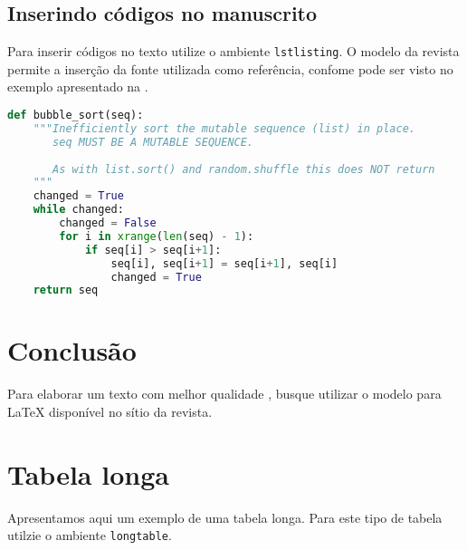 \documentclass[anonymous=true]{textolivre}
\begin{document}
\lipsum[10-14]



\subsection{Inserindo códigos no manuscrito}\label{sec-codigos}
Para inserir códigos no texto utilize o ambiente \texttt{lstlisting}. 
O modelo da revista permite a inserção da fonte utilizada como referência, confome 
pode ser visto no exemplo apresentado na .
 
\begin{lstlisting}[language=python, label=lst-code, caption={\textit{Bubble sort}, ou ordenação por flutuação.}, source={Rosetta Code (\url{https://rosettacode.org/wiki/Sorting_algorithms/Bubble_sort}).}]
def bubble_sort(seq):
    """Inefficiently sort the mutable sequence (list) in place.
       seq MUST BE A MUTABLE SEQUENCE.
 
       As with list.sort() and random.shuffle this does NOT return 
    """
    changed = True
    while changed:
        changed = False
        for i in xrange(len(seq) - 1):
            if seq[i] > seq[i+1]:
                seq[i], seq[i+1] = seq[i+1], seq[i]
                changed = True
    return seq
\end{lstlisting} %



\lipsum[20-21]


\section{Conclusão}\label{sec-conclusao}
Para elaborar um texto com melhor qualidade \cite{donaldknuth1984,leslielamport1994,araujo2020}, busque utilizar o modelo para \LaTeX{} 
disponível no sítio da revista.

\lipsum[17-19]



\printbibliography\label{sec-bib}

\appendix 
\section{Tabela longa}\label{apx-longtable}
Apresentamos aqui um exemplo de uma tabela longa. Para este tipo de tabela utilzie o ambiente \texttt{longtable}.
\end{document}
